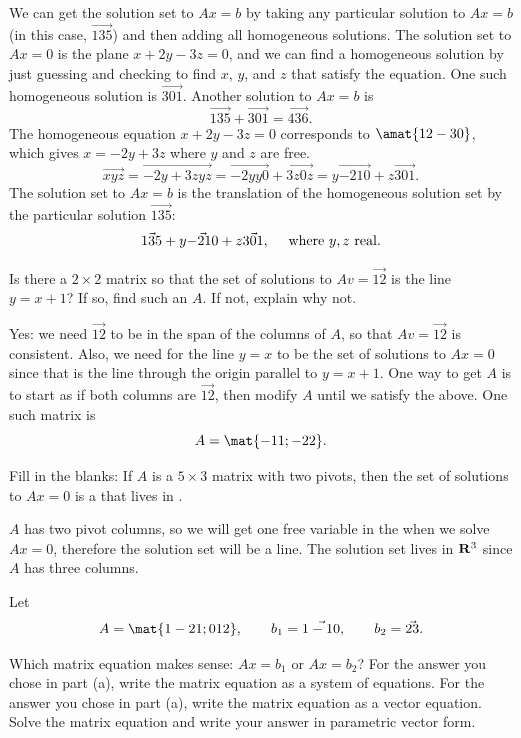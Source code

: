 \begin{problems}
\begin{solution}
\begin{subproblems}
\subproblem We can get the solution set to $Ax=b$ by taking any particular solution to $Ax = b$ (in this case, $\vec{1 3 5}$) and then adding all homogeneous solutions.  The solution set to $Ax=0$ is the plane $x+2y-3z=0$, and we can find a homogeneous solution by just guessing and checking to find $x$, $y$, and $z$ that satisfy the equation.  One such homogeneous solution is $\vec{3 0 1}$.  Another solution to $Ax = b$ is
\[\vec{1 3 5} + \vec{3 0 1} = \vec{4 3 6}.\]
\subproblem The homogeneous equation $x+2y-3z=0$ corresponds to $\amat{1 2 -3 0}$, which gives $x = -2y + 3z$ where $y$ and $z$ are free.
\[\vec{x y z} = \vec{-2y+3z y z} = \vec{-2y y 0} + \vec{3z 0 z}
= y \vec{-2 1 0} + z \vec{3 0 1}.\]
The solution set to $Ax = b$ is the translation of the homogeneous solution set by the particular solution $\vec{1 3 5}$:
\[\vec{1 3 5} + y \vec{-2 1 0} + z \vec{3 0 1}, \quad \textup{ where } y, z \textup{ real}.\]
\end{subproblems}    
\end{solution}

\problem %
Is there a $2 \times 2$ matrix so that the set of solutions to $Av = \vec{1 2}$ is the line $y = x + 1$?  If so, find such an $A$.  If not, explain why not.

\begin{solution}
Yes: we need $\vec{1 2}$ to be in the span of the columns of $A$, so that $Av = \vec{1 2}$ is consistent.  Also, we need for the line $y=x$ to be the set of solutions to $Ax=0$ since that is the line through the origin parallel to $y=x+1$.  One way to get $A$ is to start as if both columns are $\vec{1 2}$, then modify $A$ until we satisfy the above.  One such matrix is \[A = \mat{-1 1; -2 2}.\]
\end{solution}

\problem %
Fill in the blanks: If $A$ is a $5 \times 3$ matrix with two pivots,
then the set of solutions to $Ax = 0$ is a \underline{\qquad \quad}
that lives in \underline{\qquad}.

\begin{solution}
  $A$ has two pivot columns, so we will get one free variable in the
  when we solve $Ax = 0$, therefore the solution set will be a line.
  The solution set lives in ${\bf R}^3$ since $A$ has three columns.
\end{solution}


\problem %
Let
\[A = \mat{1 -2 1; 0 1 2}, \qquad
  b_1 = \vec{1 -1 0}, \qquad
  b_2 = \vec{2 3}.\]
\begin{subproblems}
  \subproblem Which matrix equation makes sense: $Ax = b_1$ or
  $Ax = b_2$? %
  \subproblem For the answer you chose in part (a), write the matrix
  equation as a system of equations. %
  \subproblem For the answer you chose in part (a), write the matrix
  equation as a vector equation. %
  \subproblem Solve the matrix equation and write your answer in
  parametric vector form.
\end{subproblems}


\end{problems}
